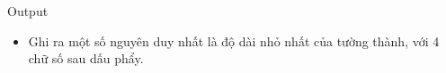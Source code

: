 Output
\begin{itemize}
	\item Ghi ra một số nguyên duy nhất là độ dài nhỏ nhất của tường thành, với 4 chữ số sau dấu phẩy.
\end{itemize}